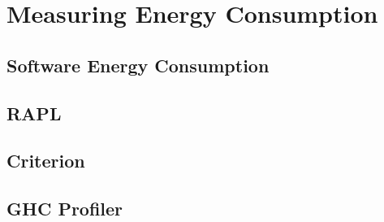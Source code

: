 \chapter{Measuring Energy Consumption}

\section{Software Energy Consumption}
\lipsum[1-3]


\section{RAPL}
\lipsum[1-3]


\section{Criterion}
\lipsum[1-4]


\section{GHC Profiler}
\lipsum[1-4]
